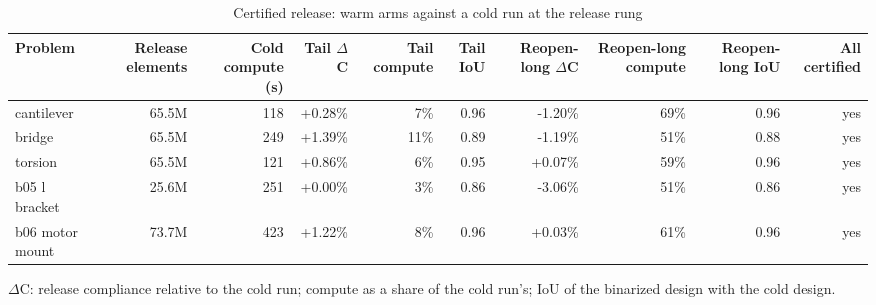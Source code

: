 \begin{table}[t]
\centering\small
\caption{Certified release: warm arms against a cold run at the release rung}
\label{tab:t3_x1_escalation}
\begin{tabular}{lrrrrrrrrr}
\toprule
Problem & Release elements & Cold compute (s) & Tail $\Delta$C & Tail compute & Tail IoU & Reopen-long $\Delta$C & Reopen-long compute & Reopen-long IoU & All certified \\
\midrule
cantilever & 65.5M & 118 & +0.28\% & 7\% & 0.96 & -1.20\% & 69\% & 0.96 & yes \\
bridge & 65.5M & 249 & +1.39\% & 11\% & 0.89 & -1.19\% & 51\% & 0.88 & yes \\
torsion & 65.5M & 121 & +0.86\% & 6\% & 0.95 & +0.07\% & 59\% & 0.96 & yes \\
b05 l bracket & 25.6M & 251 & +0.00\% & 3\% & 0.86 & -3.06\% & 51\% & 0.86 & yes \\
b06 motor mount & 73.7M & 423 & +1.22\% & 8\% & 0.96 & +0.03\% & 61\% & 0.96 & yes \\
\bottomrule
\end{tabular}
\par\smallskip\footnotesize $\Delta$C: release compliance relative to the cold run; compute as a share of the cold run's; IoU of the binarized design with the cold design.
\end{table}
